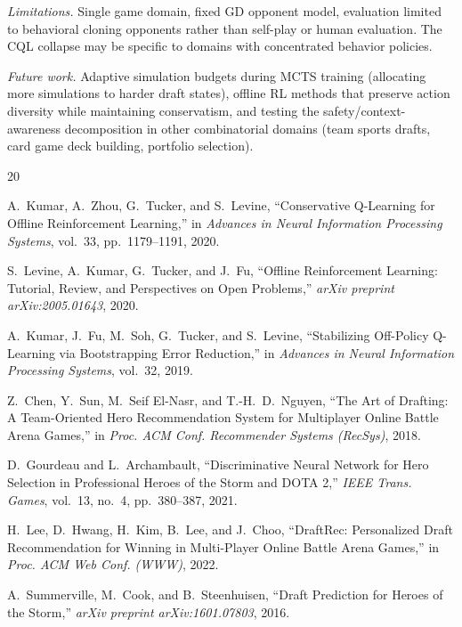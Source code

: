 \documentclass[journal]{IEEEtran}
\begin{document}
\textit{Limitations.} Single game domain, fixed GD opponent model, evaluation limited to behavioral cloning opponents rather than self-play or human evaluation. The CQL collapse may be specific to domains with concentrated behavior policies.

\textit{Future work.} Adaptive simulation budgets during MCTS training (allocating more simulations to harder draft states), offline RL methods that preserve action diversity while maintaining conservatism, and testing the safety/context-awareness decomposition in other combinatorial domains (team sports drafts, card game deck building, portfolio selection).

\begin{thebibliography}{20}

A.~Kumar, A.~Zhou, G.~Tucker, and S.~Levine, ``Conservative Q-Learning for Offline Reinforcement Learning,'' in \textit{Advances in Neural Information Processing Systems}, vol.~33, pp.~1179--1191, 2020.

S.~Levine, A.~Kumar, G.~Tucker, and J.~Fu, ``Offline Reinforcement Learning: Tutorial, Review, and Perspectives on Open Problems,'' \textit{arXiv preprint arXiv:2005.01643}, 2020.

A.~Kumar, J.~Fu, M.~Soh, G.~Tucker, and S.~Levine, ``Stabilizing Off-Policy Q-Learning via Bootstrapping Error Reduction,'' in \textit{Advances in Neural Information Processing Systems}, vol.~32, 2019.

Z.~Chen, Y.~Sun, M.~Seif El-Nasr, and T.-H.~D.~Nguyen, ``The Art of Drafting: A Team-Oriented Hero Recommendation System for Multiplayer Online Battle Arena Games,'' in \textit{Proc. ACM Conf. Recommender Systems (RecSys)}, 2018.

D.~Gourdeau and L.~Archambault, ``Discriminative Neural Network for Hero Selection in Professional Heroes of the Storm and DOTA 2,'' \textit{IEEE Trans. Games}, vol.~13, no.~4, pp.~380--387, 2021.

H.~Lee, D.~Hwang, H.~Kim, B.~Lee, and J.~Choo, ``DraftRec: Personalized Draft Recommendation for Winning in Multi-Player Online Battle Arena Games,'' in \textit{Proc. ACM Web Conf. (WWW)}, 2022.

A.~Summerville, M.~Cook, and B.~Steenhuisen, ``Draft Prediction for Heroes of the Storm,'' \textit{arXiv preprint arXiv:1601.07803}, 2016.


\end{thebibliography}
\end{document}
